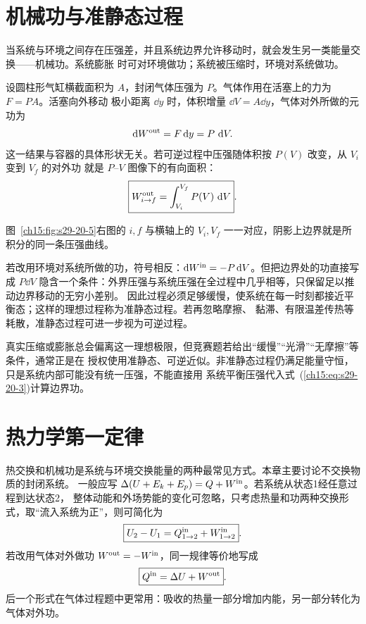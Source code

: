 {\section{机械功与准静态过程}

当系统与环境之间存在压强差，并且系统边界允许移动时，就会发生另一类能量交换——机械功。系统膨胀
时可对环境做功；系统被压缩时，环境对系统做功。

设圆柱形气缸横截面积为 $A$，封闭气体压强为 $P$。气体作用在活塞上的力为 $F=PA$。活塞向外移动
极小距离 $\dd y$ 时，体积增量 $\dd V=A\dd y$，气体对外所做的元功为
\begin{equation*}
  \dd W^{\rm out}=F\dd y=P\,\dd V.
\end{equation*}
这一结果与容器的具体形状无关。若可逆过程中压强随体积按 $P(V)$ 改变，从 $V_i$ 变到 $V_f$ 的对外功
就是 $P$--$V$ 图像下的有向面积：
\begin{equation}
  \boxed{W^{\rm out}_{i\to f}=\int_{V_i}^{V_f}P(V)\,\dd V}. \label{ch15:eq:s29-20-3}
\end{equation}

\par\noindent\begin{minipage}{\linewidth}
\pistonWorkFaithful
{}\label{ch15:fig:s29-20-5}
\end{minipage}\par\medskip
图~\ref{ch15:fig:s29-20-5}右图的 $i,f$ 与横轴上的 $V_i,V_f$ 一一对应，阴影上边界就是所积分的同一条压强曲线。

若改用环境对系统所做的功，符号相反：$\dd W^{\rm in}=-P\dd V$。但把边界处的功直接写成
$P\dd V$ 隐含一个条件：外界压强与系统压强在全过程中几乎相等，只保留足以推动边界移动的无穷小差别。
因此过程必须足够缓慢，使系统在每一时刻都接近平衡态；这样的理想过程称为准静态过程。若再忽略摩擦、
黏滞、有限温差传热等耗散，准静态过程可进一步视为可逆过程。

真实压缩或膨胀总会偏离这一理想极限，但竞赛题若给出“缓慢”“光滑”“无摩擦”等条件，通常正是在
授权使用准静态、可逆近似。非准静态过程仍满足能量守恒，只是系统内部可能没有统一压强，不能直接用
系统平衡压强代入式~(\ref{ch15:eq:s29-20-3})计算边界功。

\section{热力学第一定律}

热交换和机械功是系统与环境交换能量的两种最常见方式。本章主要讨论不交换物质的封闭系统。
一般应写 $\Delta(U+E_k+E_p)=Q+W^{\rm in}$。若系统从状态1经任意过程到达状态2，
整体动能和外场势能的变化可忽略，只考虑热量和功两种交换形式，取“流入系统为正”，则可简化为
\begin{equation}
  \boxed{U_2-U_1=Q^{\rm in}_{1\to2}+W^{\rm in}_{1\to2}}. \label{ch15:eq:s29-20-4}
\end{equation}
若改用气体对外做功 $W^{\rm out}=-W^{\rm in}$，同一规律等价地写成
\begin{equation*}
  \boxed{Q^{\rm in}=\Delta U+W^{\rm out}}.
\end{equation*}
后一个形式在气体过程题中更常用：吸收的热量一部分增加内能，另一部分转化为气体对外功。

}
